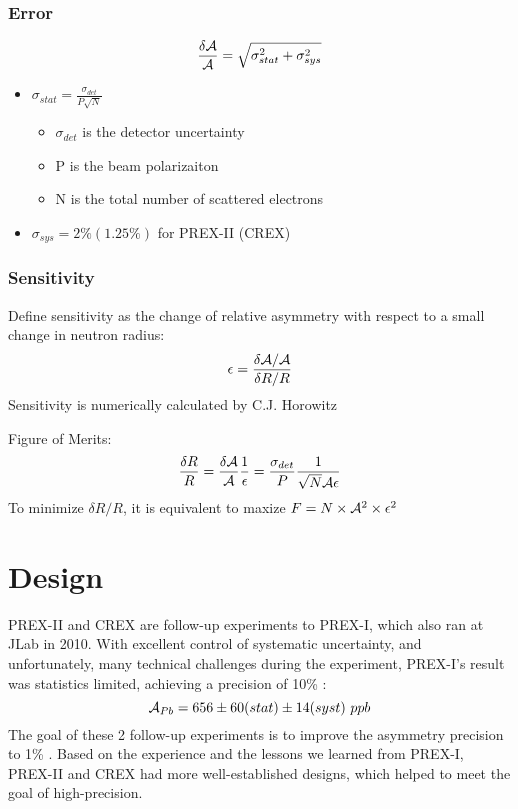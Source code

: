 \subsubsection{Error}
\begin{equation}
    \frac{\delta \mathcal{A}}{\mathcal{A}} = \sqrt{\sigma^2_{stat} + \sigma^2_{sys}}
\end{equation}
\begin{itemize}
    \item $\sigma_{stat} = \frac{\sigma_{det}}{P\sqrt{N}}$ 
	\begin{itemize}
	    \item $\sigma_{det}$ is the detector uncertainty
	    \item P is the beam polarizaiton
	    \item N is the total number of scattered electrons
	\end{itemize}
    \item $\sigma_{sys} = 2\% (1.25\%)$ for PREX-II (CREX)
\end{itemize}

\subsubsection{Sensitivity}
Define sensitivity as the change of relative asymmetry with respect to a small
change in neutron radius:
\begin{equation}
    \epsilon = \frac{\delta \mathcal{A}/\mathcal{A}}{\delta R/R}
\end{equation}
Sensitivity is numerically calculated by  C.J. Horowitz \cite{PhysRevC.57.3430}

Figure of Merits:
\begin{equation}
    \frac{\delta R}{R} = \frac{\delta \mathcal{A}}{\mathcal{A}} \frac{1}{\epsilon} 
	= \frac{\sigma_{det}}{P} \frac{1}{\sqrt{N} \mathcal{A} \epsilon}
\end{equation}
To minimize $\delta R/R$, it is equivalent to maxize $F = N\times \mathcal{A}^2 \times \epsilon^2$

\section{Design}
PREX-II and CREX are follow-up experiments to PREX-I, which also ran at JLab in 2010. 
With excellent control of systematic uncertainty, and unfortunately, 
many technical challenges during the experiment, PREX-I's result was statistics 
limited, achieving a precision of 10\% \cite{PhysRevLett.108.112502}:
$$ \CA_{Pb} = 656 \pm 60 (stat) \pm 14 (syst) \ ppb$$
The goal of these 2 follow-up experiments is to improve the asymmetry precision 
to 1\% \cite{PREX-II_proposal}. Based on the experience and the lessons we learned
from PREX-I, PREX-II and CREX had more well-established designs, which helped to
meet the goal of high-precision.

